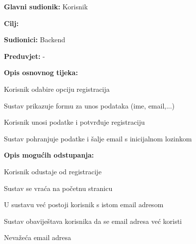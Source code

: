 					\noindent {}
					\begin{packed_item}
	
						\item \textbf{Glavni sudionik: } Korisnik
						\item  \textbf{Cilj:} 
						\item  \textbf{Sudionici:} Backend
						\item  \textbf{Preduvjet:} -
						\item  \textbf{Opis osnovnog tijeka:}  
						
						\item[] \begin{packed_enum}
	
							\item Korisnik odabire opciju registracija
							\item Sustav prikazuje formu za unos podataka (ime, email,...)
							\item Korisnik unosi podatke i potvrđuje registraciju
							\item Sustav pohranjuje podatke i šalje email s inicijalnom lozinkom
						\end{packed_enum}
						
						\item  \textbf{Opis mogućih odstupanja:}
						
						\item[] \begin{packed_item}
	
							\item[3.a] Korisnik odustaje od registracije
							\item[] \begin{packed_enum}
								
								\item Sustav se vraća na početnu stranicu
								
							\end{packed_enum}
							\item[4.a] U sustavu već postoji korisnik s istom email adresom
							\item[] \begin{packed_enum}
								
								\item Sustav obaviještava korisnika da se email adresa već koristi
								
							\end{packed_enum}
							\item[4.b] Nevažeća email adresa
								
						\end{packed_item}
					\end{packed_item}
				
